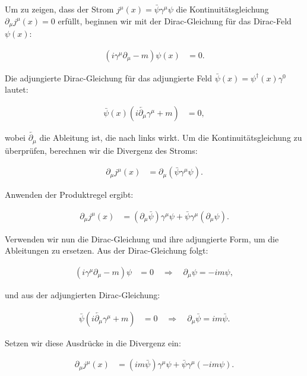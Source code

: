 Um zu zeigen, dass der Strom \( j^\mu(x) = \bar{\psi} \gamma^\mu \psi \) die Kontinuitätsgleichung \(\partial_\mu j^\mu(x) = 0\) erfüllt, beginnen wir mit der Dirac-Gleichung für das Dirac-Feld \(\psi(x)\):

\begin{align*}
(i \gamma^\mu \partial_\mu - m) \psi(x) &= 0.
\end{align*}

Die adjungierte Dirac-Gleichung für das adjungierte Feld \(\bar{\psi}(x) = \psi^\dagger(x) \gamma^0\) lautet:

\begin{align*}
\bar{\psi}(x) (i \overleftarrow{\partial_\mu} \gamma^\mu + m) &= 0,
\end{align*}

wobei \(\overleftarrow{\partial_\mu}\) die Ableitung ist, die nach links wirkt. Um die Kontinuitätsgleichung zu überprüfen, berechnen wir die Divergenz des Stroms:

\begin{align*}
\partial_\mu j^\mu(x) &= \partial_\mu (\bar{\psi} \gamma^\mu \psi).
\end{align*}

Anwenden der Produktregel ergibt:

\begin{align*}
\partial_\mu j^\mu(x) &= (\partial_\mu \bar{\psi}) \gamma^\mu \psi + \bar{\psi} \gamma^\mu (\partial_\mu \psi).
\end{align*}

Verwenden wir nun die Dirac-Gleichung und ihre adjungierte Form, um die Ableitungen zu ersetzen. Aus der Dirac-Gleichung folgt:

\begin{align*}
(i \gamma^\mu \partial_\mu - m) \psi &= 0 \quad \Rightarrow \quad \partial_\mu \psi = -i m \psi,
\end{align*}

und aus der adjungierten Dirac-Gleichung:

\begin{align*}
\bar{\psi} (i \overleftarrow{\partial_\mu} \gamma^\mu + m) &= 0 \quad \Rightarrow \quad \partial_\mu \bar{\psi} = i m \bar{\psi}.
\end{align*}

Setzen wir diese Ausdrücke in die Divergenz ein:

\begin{align*}
\partial_\mu j^\mu(x) &= (i m \bar{\psi}) \gamma^\mu \psi + \bar{\psi} \gamma^\mu (-i m \psi).
\end{align*}

